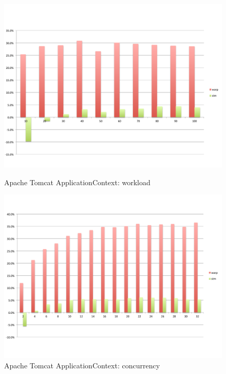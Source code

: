 \begin{figure}
	\begin{minipage}{0.45 \textwidth}
		\includegraphics[width=\textwidth]{../../eval/32threads/case1it.pdf}
		\caption{\label{Fi:case1it}Apache Tomcat {\sf ApplicationContext}: workload}
	\end{minipage}
	\hspace{0.1 \textwidth}
	\begin{minipage}{0.45 \textwidth}
		\includegraphics[width=\textwidth]{../../eval/32threads/case1th.pdf}
		\caption{\label{Fi:case1th}Apache Tomcat {\sf ApplicationContext}: concurrency}
	\end{minipage}
	\begin{minipage}{0.45 \textwidth}

\end{minipage}
\end{figure}
